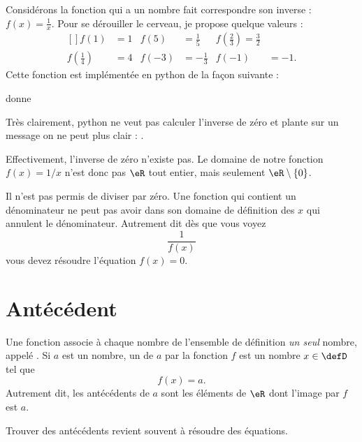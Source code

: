 \begin{example}
    Considérons la fonction qui a un nombre fait correspondre son inverse : \( f(x)=\frac{1}{ x }\). Pour se dérouiller le cerveau, je propose quelque valeurs :
    \begin{equation}
        \begin{aligned}[]
            f(1)&=1&f(5)&=\frac{1}{ 5 }&f(\frac{ 2 }{ 3 })=\frac{ 3 }{ 2 }\\
            f(\frac{ 1 }{ 4 })&=4&f(-3)&=-\frac{1}{ 3 }&f(-1)&=-1.
        \end{aligned}
    \end{equation}
    Cette fonction est implémentée en python de la façon suivante :



donne



Très clairement, python ne veut pas calculer l'inverse de zéro et plante sur un message on ne peut plus clair : .

Effectivement, l'inverse de zéro n'existe pas. Le domaine de notre fonction \( f(x)=1/x\) n'est donc pas \( \eR\) tout entier, mais seulement \( \eR\setminus\{ 0 \}\).

\end{example}

\begin{Aretenir}        \label{ArtJgipNt}
    Il n'est pas permis de diviser par zéro. Une fonction qui contient un dénominateur ne peut pas avoir dans son domaine de définition des \( x\) qui annulent le dénominateur. Autrement dit dès que vous voyez
    \begin{equation}
        \frac{1}{ f(x) }
    \end{equation}
    vous devez résoudre l'équation \( f(x)=0\).
\end{Aretenir}

\section{Antécédent}

\begin{Aretenir}
Une fonction associe à chaque nombre de l'ensemble de définition \emph{un seul} nombre, appelé . Si \( a\) est un nombre, un  de \( a\) par la fonction \( f\) est un nombre \( x\in\defD\) tel que 
\begin{equation}
    f(x)=a.
\end{equation}
Autrement dit, les antécédents de \( a\) sont les éléments de \( \eR\) dont l'image par \( f\) est \( a\).
\end{Aretenir}
Trouver des antécédents revient souvent à résoudre des équations.

